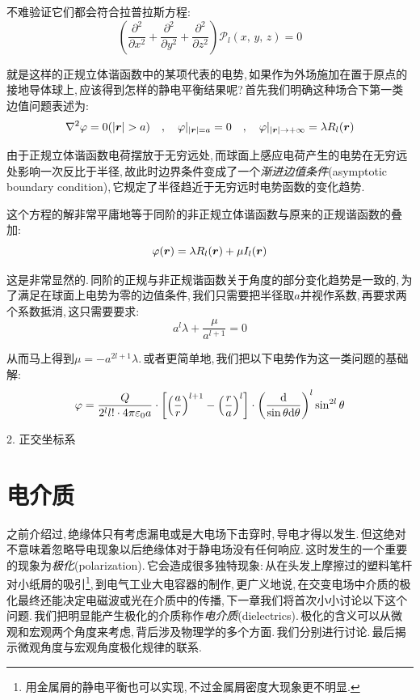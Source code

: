 不难验证它们都会符合拉普拉斯方程:
\[\left(\frac{\partial^2}{\partial x^2}+\frac{\partial^2}{\partial y^2}+\frac{\partial^2}{\partial z^2}\right)\mathcal{P}_l(x,\,y,\,z)=0\]

就是这样的正规立体谐函数中的某项代表的电势,\,如果作为外场施加在置于原点的接地导体球上,\,应该得到怎样的静电平衡结果呢?\,首先我们明确这种场合下第一类边值问题表述为:
\[\nabla^2\varphi=0(|\bs{r}|>a)\quad ,\quad \varphi|_{|\bs{r}|=a}=0 \quad ,\quad \varphi|_{|\bs{r}|\to+ \infty}=\lambda R_l(\bs{r})\]

由于正规立体谐函数电荷摆放于无穷远处,\,而球面上感应电荷产生的电势在无穷远处影响一次反比于半径,\,故此时边界条件变成了一个\emph{渐进边值条件}(asymptotic boundary condition),\,它规定了半径趋近于无穷远时电势函数的变化趋势.

这个方程的解非常平庸地等于同阶的非正规立体谐函数与原来的正规谐函数的叠加:
\[\varphi(\boldsymbol{r})=\lambda R_l(\boldsymbol{r})+\mu I_l(\boldsymbol{r})\]

这是非常显然的.\,同阶的正规与非正规谐函数关于角度的部分变化趋势是一致的,\,为了满足在球面上电势为零的边值条件,\,我们只需要把半径取$a$并视作系数,\,再要求两个系数抵消,\,这只需要要求:
\[a^l\lambda+\frac{\mu}{a^{l+1}}=0\]

从而马上得到$\mu=-a^{2l+1}\lambda$.\,或者更简单地,\,我们把以下电势作为这一类问题的基础解:
\[\varphi=\frac{Q}{2^ll!\cdot 4\pi\varepsilon_0 a}\cdot\left[\left(\frac{a}{r}\right)^{l+1}-\left(\frac{r}{a}\right)^l\right]\cdot\left(\frac{\textrm{d}}{\sin\theta\textrm{d} \theta}\right)^l\sin^{2l}\theta\]

\vspace{0.2cm}
2. 正交坐标系
\vspace{0.2cm}


\section{电介质}

之前介绍过,\,绝缘体只有考虑漏电或是大电场下击穿时,\,导电才得以发生.\,但这绝对不意味着忽略导电现象以后绝缘体对于静电场没有任何响应.\,这时发生的一个重要的现象为\emph{极化}(polarization).\,它会造成很多独特现象:\,从在头发上摩擦过的塑料笔杆对小纸屑的吸引\footnote{用金属屑的静电平衡也可以实现,\,不过金属屑密度大现象更不明显.},\,到电气工业大电容器的制作,\,更广义地说,\,在交变电场中介质的极化最终还能决定电磁波或光在介质中的传播,\,下一章我们将首次小小讨论以下这个问题.\,我们把明显能产生极化的介质称作\emph{电介质}(dielectrics).\,极化的含义可以从微观和宏观两个角度来考虑,\,背后涉及物理学的多个方面.\,我们分别进行讨论.\,最后揭示微观角度与宏观角度极化规律的联系.\,

